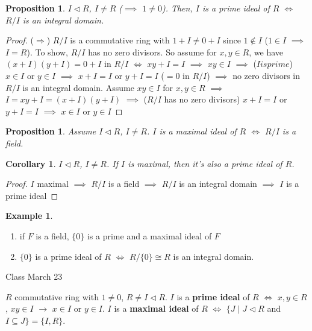 \documentclass[11pt]{article}
\newtheorem{prop}[thm]{Proposition}
\newtheorem{cor}[thm]{Corollary}
\theoremstyle{definition}
\newtheorem{example}[thm]{Example}
\numberwithin{equation}{section}
\begin{document}
\begin{prop}
$I \vartriangleleft R$, $I \neq R$ ($\implies$ $1 \neq 0$). Then, $I$ is a prime ideal of $R$ $\Leftrightarrow$ $R/I$ is an integral domain.
\end{prop}

\begin{proof}
($\Rightarrow$) $R/I$ is a commutative ring with $1 + I \neq 0 + I$ since $1 \notin I$ ($1 \in I$ $\implies$ $I = R$). To show, $R/I$ has no zero divisors. So assume for $x, y \in R$, we have $(x+I)(y+I) = 0 + I$ in $R/I$ $\Leftrightarrow$ $xy + I = I$ $\implies$ $xy \in I$ $\implies$ ($I is prime$) $x \in I$ or $y \in I$ $\implies$ $x + I = I$ or $y + I = I$ ($=0$ in $R/I$) $\implies$ no zero divisors in $R/I$ is an integral domain. Assume $xy \in I$ for $x, y \in R$ $\implies$ $I = xy + I = (x+I)(y+I)$ $\implies$ ($R/I$ has no zero divisors) $x+I = I$ or $y+I = I$ $\implies$ $x \in I$ or $y \in I$
\end{proof}

\begin{prop}
Assume $I \vartriangleleft R$, $I \neq R$. $I$ is a maximal ideal of $R$ $\Leftrightarrow$ $R/I$ is a field.
\end{prop}

\begin{cor}
$I \vartriangleleft R$, $I \neq R$. If $I$ is maximal, then it's also a prime ideal of $R$.
\end{cor}

\begin{proof}
$I$ maximal $\implies$ $R/I$ is a field $\implies$ $R/I$ is an integral domain $\implies$ $I$ is a prime ideal
\end{proof}

\begin{example}
\begin{enumerate}
    \item if $F$ is a field, $\{0\}$ is a prime and a maximal ideal of $F$
    \item $\{0\}$ is a prime ideal of $R$ $\Leftrightarrow$ $R/\{0\} \cong R$ is an integral domain.
\end{enumerate}
\end{example}

\begin{center}
{\sf\LARGE Class March 23}
\end{center}

$R$ commutative ring with $1 \neq 0$, $R \neq I \vartriangleleft R$. $I$ is a \textbf{prime ideal} of $R$ $\Leftrightarrow$ $x, y \in R$, $xy \in I$ $\rightarrow$ $x \in I$ or $y \in I$. $I$ is a \textbf{maximal ideal} of $R$ $\Leftrightarrow$ $\{J \mid J \vartriangleleft R$ and $I \subseteq J \} = \{I, R\}$.
\end{document}
